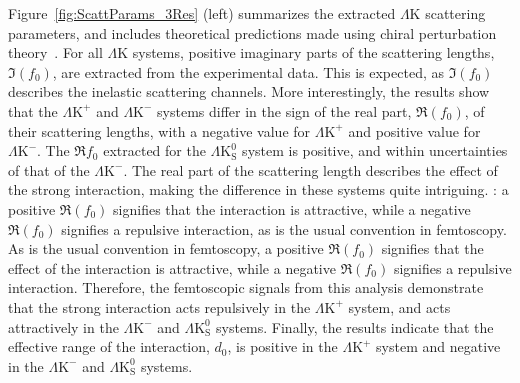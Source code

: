 \documentclass[ALICE,manyauthors]{cernphprep}
\newcommand{\LamK}{$\Lambda$K\xspace}
\newcommand{\LamKchP}{$\Lambda\mathrm{K^{+}}$\xspace}
\newcommand{\LamKchM}{$\Lambda\mathrm{K^{-}}$\xspace}
\newcommand{\LamKs}{$\Lambda\mathrm{K^{0}_{S}}$\xspace}
\begin{document}
Figure~\ref{fig:ScattParams_3Res} (left) summarizes the extracted \LamK scattering parameters, and includes theoretical predictions made using chiral perturbation theory~\cite{Liu:2006xja,Mai:2009ce}.
For all \LamK systems, positive imaginary parts of the scattering lengths, $\Im(f_{0})$, are extracted from the experimental data. 
This is expected, as $\Im(f_{0})$ describes the inelastic scattering channels.
More interestingly, the results show that the \LamKchP and \LamKchM systems differ in the sign of the real part, $\Re(f_{0})$, of their scattering lengths, with a negative value for \LamKchP and positive value for \LamKchM.
The $\Re f_{0}$ extracted for the \LamKs system is positive, and within uncertainties of that of {\color{red}the} \LamKchM. 
The real part of the scattering length describes the effect of the strong interaction{\color{red}, making the difference in these systems quite intriguing.} {\color{blue}: a positive $\Re(f_{0})$ signifies that the interaction is attractive, while a negative $\Re(f_{0})$ signifies a repulsive interaction, as is the usual convention in femtoscopy.}
{\color{red}As is the usual convention in femtoscopy, a positive $\Re(f_{0})$ signifies that the effect of the interaction is attractive, while a negative $\Re(f_{0})$ signifies a repulsive interaction.}
Therefore, the femtoscopic signals from this analysis demonstrate that the strong interaction acts repulsively in the \LamKchP system, and acts attractively in the \LamKchM and \LamKs systems.
{\color{blue}Finally, the results indicate that the effective range of the interaction, $d_{0}$, is positive in the \LamKchP system and negative in the \LamKchM and \LamKs systems.}
\end{document}
